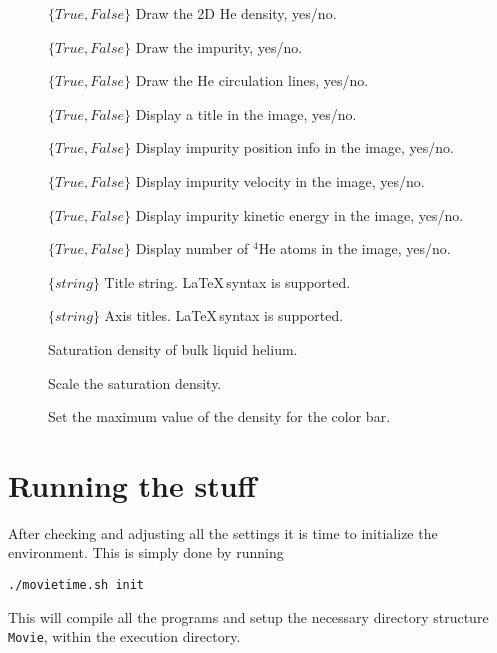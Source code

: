 \documentclass[10pt,a4paper]{article}
\begin{document}
\begin{description}
    \item[] $\{True, False\}$ Draw the 2D He density, yes/no.
    \item[] $\{True, False\}$ Draw the impurity, yes/no. 
    \item[] $\{True, False\}$ Draw the He circulation lines, yes/no.
    \item[] $\{True, False\}$ Display a title in the image, yes/no.
    \item[] $\{True, False\}$ Display impurity position info in the image, yes/no.
    \item[] $\{True, False\}$ Display impurity velocity in the image, yes/no.
    \item[] $\{True, False\}$ Display impurity kinetic energy in the image, yes/no.
    \item[] $\{True, False\}$ Display number of $^4$He atoms in the image, yes/no.
    \item[] $\{string\}$ Title string. \LaTeX$\,$syntax is supported.
    \item[] $\{string\}$ Axis titles. \LaTeX$\,$syntax is supported.
    \item[] Saturation density of bulk liquid helium.
    \item[] Scale the saturation density.
    \item[] Set the maximum value of the density for the color bar.
\end{description}

\section{Running the stuff}
After checking and adjusting all the settings it is time to initialize the environment. This is simply done by running
\begin{verbatim}
./movietime.sh init
\end{verbatim}
This will compile all the programs and setup the necessary directory structure \verb+Movie+, within the execution directory.
\end{document}
